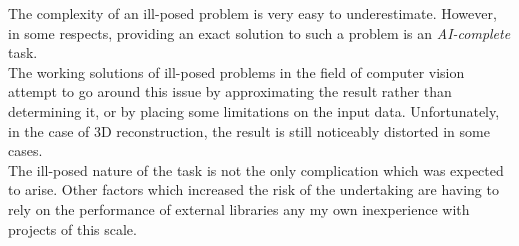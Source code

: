 \documentclass[12pt,a4paper,twoside,openright]{report}
\begin{document}
The complexity of an ill-posed problem is very easy to underestimate. However, in some respects, providing an exact solution to such a problem is an \textit{AI-complete} task.\\
The working solutions of ill-posed problems in the field of computer vision attempt to go around this issue by approximating the result rather than determining it, or by placing some limitations on the input data. Unfortunately, in the case of 3D reconstruction, the result is still noticeably distorted in some cases.\\
\linebreak
The ill-posed nature of the task is not the only complication which was expected to arise. Other factors which increased the risk of the undertaking are having to rely on the performance of external libraries any my own inexperience with projects of this scale. 
\end{document}
